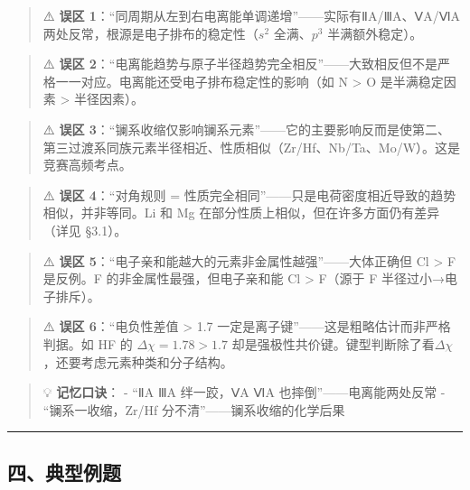 \documentclass[a4paper,11pt]{ctexart}
\begin{document}
\begin{quote}
⚠️ \textbf{误区 1}：``同周期从左到右电离能单调递增''------实际有ⅡA/ⅢA、ⅤA/ⅥA 两处反常，根源是电子排布的稳定性（\(s^2\) 全满、\(p^3\) 半满额外稳定）。
\end{quote}

\begin{quote}
⚠️ \textbf{误区 2}：``电离能趋势与原子半径趋势完全相反''------大致相反但不是严格一一对应。电离能还受电子排布稳定性的影响（如 N \textgreater{} O 是半满稳定因素 \textgreater{} 半径因素）。
\end{quote}

\begin{quote}
⚠️ \textbf{误区 3}：``镧系收缩仅影响镧系元素''------它的主要影响反而是使第二、第三过渡系同族元素半径相近、性质相似（Zr/Hf、Nb/Ta、Mo/W）。这是竞赛高频考点。
\end{quote}

\begin{quote}
⚠️ \textbf{误区 4}：``对角规则 = 性质完全相同''------只是电荷密度相近导致的趋势相似，并非等同。Li 和 Mg 在部分性质上相似，但在许多方面仍有差异（详见 §3.1）。
\end{quote}

\begin{quote}
⚠️ \textbf{误区 5}：``电子亲和能越大的元素非金属性越强''------大体正确但 Cl \textgreater{} F 是反例。F 的非金属性最强，但电子亲和能 Cl \textgreater{} F（源于 F 半径过小→电子排斥）。
\end{quote}

\begin{quote}
⚠️ \textbf{误区 6}：``电负性差值 \textgreater{} 1.7 一定是离子键''------这是粗略估计而非严格判据。如 HF 的 \(\Delta\chi=1.78>1.7\) 却是强极性共价键。键型判断除了看\(\Delta\chi\)，还要考虑元素种类和分子结构。
\end{quote}

\begin{quote}
💡 \textbf{记忆口诀}：
- ``ⅡA ⅢA 绊一跤，ⅤA ⅥA 也摔倒''------电离能两处反常
- ``镧系一收缩，Zr/Hf 分不清''------镧系收缩的化学后果
\end{quote}

\begin{center}\rule{0.5\linewidth}{0.5pt}\end{center}

\subsection{四、典型例题}\label{ux56dbux5178ux578bux4f8bux9898}
\end{document}
